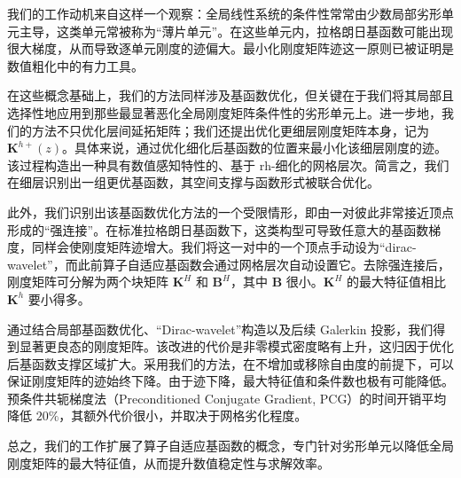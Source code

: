 我们的工作动机来自这样一个观察：全局线性系统的条件性常常由少数局部劣形单元主导，这类单元常被称为“薄片单元”。在这些单元内，拉格朗日基函数可能出现很大梯度，从而导致逐单元刚度的迹偏大。最小化刚度矩阵迹这一原则已被证明是数值粗化中的有力工具。

在这些概念基础上，我们的方法同样涉及基函数优化，但关键在于我们将其局部且选择性地应用到那些最显著恶化全局刚度矩阵条件性的劣形单元上。进一步地，我们的方法不只优化层间延拓矩阵；我们还提出优化更细层刚度矩阵本身，记为 $\mathbf{K}^{h+}(z)$。具体来说，通过优化细化后基函数的位置来最小化该细层刚度的迹。该过程构造出一种具有数值感知特性的、基于 rh-细化的网格层次。简言之，我们在细层识别出一组更优基函数，其空间支撑与函数形式被联合优化。

此外，我们识别出该基函数优化方法的一个受限情形，即由一对彼此非常接近顶点形成的“强连接”。在标准拉格朗日基函数下，这类构型可导致任意大的基函数梯度，同样会使刚度矩阵迹增大。我们将这一对中的一个顶点手动设为“dirac-wavelet”，而此前算子自适应基函数会通过网格层次自动设置它。去除强连接后，刚度矩阵可分解为两个块矩阵 $\mathbf{K}^H$ 和 $\mathbf{B}^H$，其中 $\mathbf{B}$ 很小。$\mathbf{K}^H$ 的最大特征值相比 $\mathbf{K}^h$ 要小得多。

通过结合局部基函数优化、“Dirac-wavelet”构造以及后续 Galerkin 投影，我们得到显著更良态的刚度矩阵。该改进的代价是非零模式密度略有上升，这归因于优化后基函数支撑区域扩大。采用我们的方法，在不增加或移除自由度的前提下，可以保证刚度矩阵的迹始终下降。由于迹下降，最大特征值和条件数也极有可能降低。预条件共轭梯度法（Preconditioned Conjugate Gradient, PCG）的时间开销平均降低 $20\%$，其额外代价很小，并取决于网格劣化程度。

总之，我们的工作扩展了算子自适应基函数的概念，专门针对劣形单元以降低全局刚度矩阵的最大特征值，从而提升数值稳定性与求解效率。
